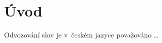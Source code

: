 \hypertarget{uxfavod}{%
\chapter*{Úvod}\label{uvod}
}

Odvozování slov je v~českém jazyce považováno \ldots{}
